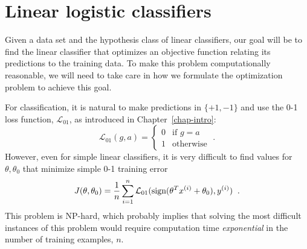 

\section{Linear logistic classifiers}

\label{sec-lin_log_classifiers}

Given a data set and the hypothesis class of linear classifiers,
our goal will be to find the linear classifier that optimizes an
objective function relating its predictions to the training data.
To make this problem computationally reasonable, we will need to
take care in how we formulate the optimization problem to achieve
this goal.

For classification, it is natural to make predictions in $\{+1, -1\}$
and use the 0-1 loss function, $\mathcal{L}_{01}$, as introduced in Chapter~\ref{chap-intro}:
\[\mathcal{L}_{01}(g, a) = \begin{cases}
    0 & \text{if $g = a$} \\
    1 & \text{otherwise}
  \end{cases} \; .
\]
However, even for simple linear
classifiers, it is very difficult to
find values for $\theta, \theta_0$ that minimize simple 0-1 training error
\[J(\theta, \theta_0) = \frac{1}{n} \sum_{i=1}^n \mathcal{L}_{01}(\text{sign}(\theta^Tx^{(i)} + \theta_0),
  y^{(i)})\;\;.\]
This problem is NP-hard, which probably%
implies
that solving the most difficult instances of this problem would
require computation time {\em exponential} in the number of training
examples, $n$.


